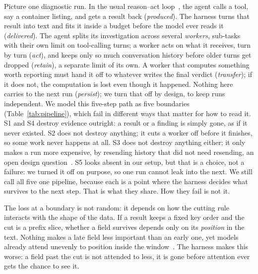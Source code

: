 \documentclass[10pt,conference]{IEEEtran}
\begin{document}
Picture one diagnostic run. In the usual reason--act
loop~\cite{yao2023react}, the agent calls a tool, say a container
listing, and gets a result back (\emph{produced}). The harness turns
that result into text and fits it inside a budget before the model ever
reads it (\emph{delivered}). The agent splits its investigation across
several \emph{workers}, sub-tasks with their own limit on tool-calling
turns; a worker acts on what it receives, turn by turn (\emph{act}), and
keeps only so much conversation history before older turns get dropped
(\emph{retain}), a separate limit of its own. A worker that computes
something worth reporting must
hand it off to whatever writes the final verdict (\emph{transfer}); if
it does not, the computation is lost even though it happened. Nothing
here carries to the next run (\emph{persist}); we turn that off by
design, to keep runs independent. We model this five-step path as five
boundaries (Table~\ref{tab:pipeline}), which fail in different ways that
matter for how to read it. S1 and S4 destroy evidence outright: a result or
a finding is simply gone, as if it never existed. S2 does not destroy
anything; it cuts a worker off before it finishes, so some work never
happens at all. S3 does not destroy anything either; it only makes a run
more expensive, by resending history that did not need resending, an open
design question~\cite{lindenbauer2025complexity,fan2026harnessdesign}. S5
looks absent in our setup, but that is a choice, not a failure: we turned
it off on purpose, so one run cannot leak into the next. We still call
all five one pipeline, because each is a point where the harness decides
what survives to the next step. That is what they share. How they fail is
not it.

The loss at a boundary is not random: it depends on how the cutting rule
interacts with the shape of the data. If a result keeps a fixed key
order and the cut is a prefix slice, whether a field survives depends
only on its \emph{position} in the text. Nothing makes a late field less
important than an early one, yet models already attend unevenly to
position inside the window~\cite{liu2024lost}. The harness makes this
worse: a field past the cut is not attended to less, it is gone before
attention ever gets the chance to see it.
\end{document}
